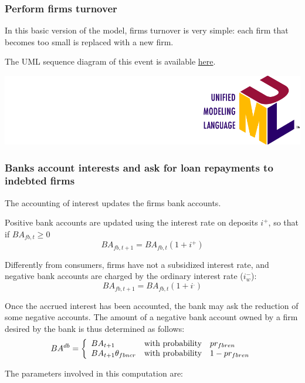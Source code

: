 \documentclass{book}
\newcommand{\umllocation}{file:///Users/giulioni/Dropbox/svn/sfcabm_my/documentation}
\begin{document}
\subsubsection{Perform firms turnover}

In this basic version of the model, firms turnover is very simple: each firm that becomes too small is replaced with a new firm.

The UML sequence diagram of this event is available \href{\umllocation/performFirmsExit.html}{here}.
\begin{marginfigure}
	\includegraphics[scale=0.1]{uml.png}
\end{marginfigure}




\subsubsection{Banks account interests and ask for loan repayments to indebted firms}

The accounting of interest updates the firms bank accounts.

Positive bank accounts are updated using the interest rate on deposits $i^+$, so that if $BA_{fb,t}\ge 0$
\[
BA_{fb,t+1}=BA_{fb,t}(1+i^+)
\]

Differently from consumers, firms have not a subsidized interest rate, and negative bank accounts are charged by the ordinary interest rate ($i^-_{w}$):
\[
BA_{fb,t+1}=BA_{fb,t}(1+i^.)
\]

Once the accrued interest has been accounted, the bank may ask the reduction of some negative accounts.
The amount of a negative bank account owned by a firm desired by the bank is thus determined as follows:
\[
	BA^{db}=\left\{ 
		\begin{array}{l l l}
			BA_{t+1}&\textnormal{with probability}& pr_{fbren}\\
			BA_{t+1}\theta_{fbncr}&\textnormal{with probability}& 1-pr_{fbren}\\
		\end{array}
		\right.
\]

The parameters involved in this computation are:
\end{document}
